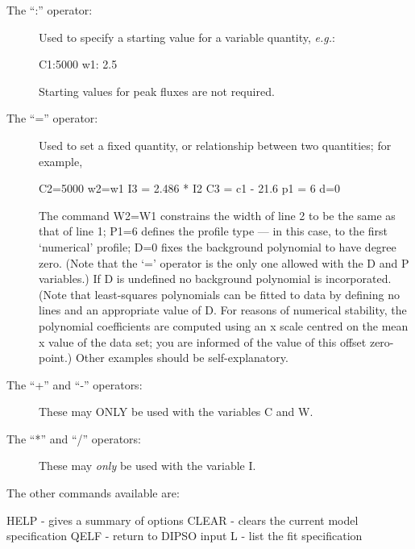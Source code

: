 \documentclass[twoside,11pt,noabs,nolof]{starlink}
\begin{document}
\begin{description}

\item [The ``:'' operator:]

Used to specify a starting value for a variable quantity, \emph{e.g.}:

\begin{terminalv}
C1:5000
w1: 2.5
\end{terminalv}

Starting values for peak fluxes are not required.

\item [The ``='' operator:]

Used to set a fixed quantity, or relationship between two quantities; for
example,

\begin{terminalv}
C2=5000
w2=w1
I3 = 2.486 * I2
C3 = c1 - 21.6
p1 = 6
d=0
\end{terminalv}

The command W2=W1 constrains the width of line 2 to be the same as
that of line 1; P1=6 defines the profile type --- in this case, to the
first `numerical' profile; D=0 fixes the background polynomial to have
degree zero. (Note that the `=' operator is the only one allowed with
the D and P variables.) If D is undefined no background polynomial is
incorporated. (Note that least-squares polynomials can be fitted to
data by defining no lines and an appropriate value of D. For reasons
of numerical stability, the polynomial coefficients are computed using
an x scale centred on the mean x value of the data set; you are
informed of the value of this offset zero-point.) Other examples
should be self-explanatory.

\item [The ``+'' and ``-'' operators:]

These may ONLY be used with the variables C and W.

\item [The ``*'' and ``/'' operators:]

These may \emph{only} be used with the variable I.

\end{description}

The other commands available are:

\begin{terminalv}
HELP - gives a summary of options
CLEAR - clears the current model specification
QELF - return to DIPSO input
L - list the fit specification
\end{terminalv}
\end{document}
